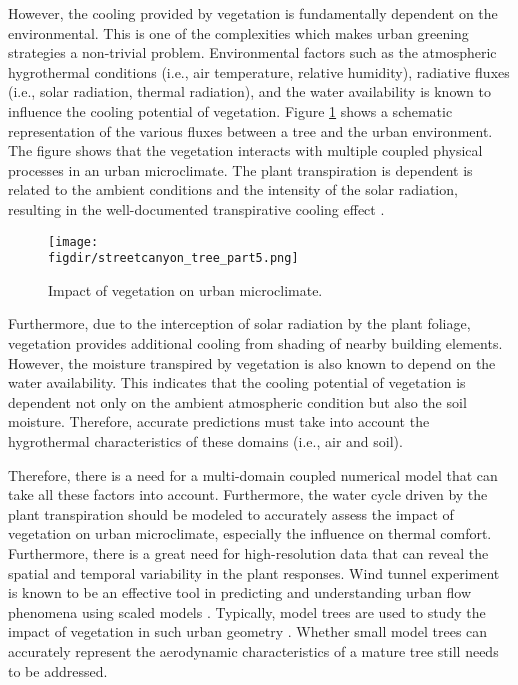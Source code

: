 However, the cooling provided by vegetation is fundamentally dependent on the environmental. This is one of the complexities which makes urban greening strategies a non-trivial problem. Environmental factors such as the atmospheric hygrothermal conditions (i.e., air temperature, relative humidity), radiative fluxes (i.e., solar radiation, thermal radiation), and the water availability is known to influence the cooling potential of vegetation. Figure \ref{fig:vegetation_fluxes} shows a schematic representation of the various fluxes between a tree and the urban environment. The figure shows that the vegetation interacts with multiple coupled physical processes in an urban microclimate. The plant transpiration is dependent is related to the ambient conditions and the intensity of the solar radiation, resulting in the well-documented transpirative cooling effect \citep{Oke2017,Farquhar2007,abtew2012evaporation,Melesse2008}.

\begin{figure}[t]
	\centering
	\texttt{[image: \\figdir/streetcanyon\_tree\_part5.png]}
	\caption{Impact of vegetation on urban microclimate.}
	\label{fig:vegetation_fluxes}
\end{figure}

Furthermore, due to the interception of solar radiation by the plant foliage, vegetation provides additional cooling from shading of nearby building elements. However, the moisture transpired by vegetation is also known to depend on the water availability. This indicates that the cooling potential of vegetation is dependent not only on the ambient atmospheric condition but also the soil moisture. Therefore, accurate predictions must take into account the hygrothermal characteristics of these domains (i.e., air and soil).

Therefore, there is a need for a multi-domain coupled numerical model that can take all these factors into account. Furthermore, the water cycle driven by the plant transpiration should be modeled to accurately assess the impact of vegetation on urban microclimate, especially the influence on thermal comfort. Furthermore, there is a great need for high-resolution data that can reveal the spatial and temporal variability in the plant responses. Wind tunnel experiment is known to be an effective tool in predicting and understanding urban flow phenomena using scaled models \citep{Allegrini2012,Paterna2015}. Typically, model trees are used to study the impact of vegetation in such urban geometry \citep{Gromke2008a}. Whether small model trees can accurately represent the aerodynamic characteristics of a mature tree still needs to be addressed. 

